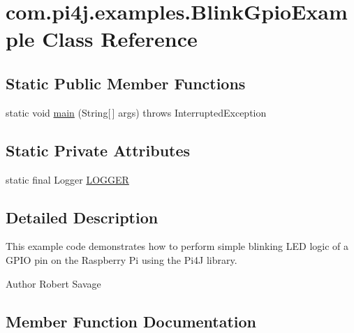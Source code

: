 \hypertarget{classcom_1_1pi4j_1_1examples_1_1BlinkGpioExample}{}\section{com.\+pi4j.\+examples.\+Blink\+Gpio\+Example Class Reference}
\label{classcom_1_1pi4j_1_1examples_1_1BlinkGpioExample}
\subsection*{Static Public Member Functions}
\begin{DoxyCompactItemize}
\item 
static void \hyperlink{classcom_1_1pi4j_1_1examples_1_1BlinkGpioExample_aa7400cd40bea55492324cac983f1810c}{main} (String\mbox{[}$\,$\mbox{]} args)  throws Interrupted\+Exception 
\end{DoxyCompactItemize}
\subsection*{Static Private Attributes}
\begin{DoxyCompactItemize}
\item 
static final Logger \hyperlink{classcom_1_1pi4j_1_1examples_1_1BlinkGpioExample_a94377a8c299f5f0f89c23f0913f26f6a}{L\+O\+G\+G\+E\+R}
\end{DoxyCompactItemize}


\subsection{Detailed Description}
This example code demonstrates how to perform simple blinking L\+E\+D logic of a G\+P\+I\+O pin on the Raspberry Pi using the Pi4\+J library.

\begin{DoxyAuthor}{Author}
Robert Savage 
\end{DoxyAuthor}


\subsection{Member Function Documentation}
\hypertarget{classcom_1_1pi4j_1_1examples_1_1BlinkGpioExample_aa7400cd40bea55492324cac983f1810c}{}
